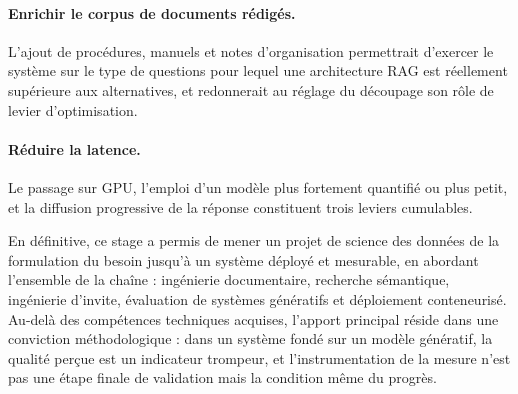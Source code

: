 \paragraph{Enrichir le corpus de documents rédigés.}
L'ajout de procédures, manuels et notes d'organisation permettrait d'exercer le
système sur le type de questions pour lequel une architecture RAG est réellement
supérieure aux alternatives, et redonnerait au réglage du découpage son rôle de
levier d'optimisation.

\paragraph{Réduire la latence.}
Le passage sur GPU, l'emploi d'un modèle plus fortement quantifié ou plus petit,
et la diffusion progressive de la réponse constituent trois leviers cumulables.

\vspace{0.5cm}

En définitive, ce stage a permis de mener un projet de science des données de la
formulation du besoin jusqu'à un système déployé et mesurable, en abordant
l'ensemble de la chaîne : ingénierie documentaire, recherche sémantique,
ingénierie d'invite, évaluation de systèmes génératifs et déploiement
conteneurisé. Au-delà des compétences techniques acquises, l'apport principal
réside dans une conviction méthodologique : dans un système fondé sur un modèle
génératif, la qualité perçue est un indicateur trompeur, et l'instrumentation de
la mesure n'est pas une étape finale de validation mais la condition même du
progrès.
